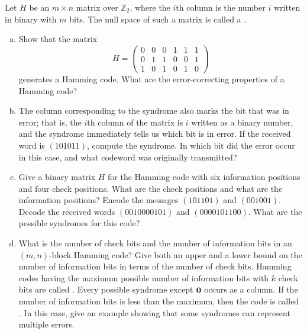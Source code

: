 \begin{exercise}{}
Let $H$ be an $m \times n$ matrix over $\mathbb{Z}_2$, where the $i$th
column is the number $i$ written in binary with $m$ bits. The null
space of such a matrix is called a . 

\begin{enumerate}[(a)]
\item
Show  that the matrix
\[
H =
\left(
\begin{array}{cccccc}
0 & 0 & 0 & 1 & 1 & 1 \\
0 & 1 & 1 & 0 & 0 & 1 \\
1 & 0 & 1 & 0 & 1 & 0
\end{array}
\right)
\]
generates a Hamming code. What are the error-correcting properties of
a Hamming code? 
 
\item
The column corresponding to the syndrome also marks the bit that was
in error; that is, the $i$th column of the matrix is $i$ written as a
binary number, and the syndrome 
immediately tells us which bit is in error. If the received word is 
$(101011)$, compute the syndrome.  In
which bit did the error occur in this case, and what codeword was
originally transmitted?
 
\item
Give a binary matrix $H$ for the Hamming code with six information
positions and four check positions. What are the check positions and
what are the information positions? Encode the messages $(101101)$ and
$(001001)$. Decode the received words $(0010000101)$ and
$(0000101100)$.  What are the possible syndromes for this code?
 
\item
What is the number of check bits and the number of information bits in an
$(m,n)$-block Hamming code? Give both an upper and a lower bound on the
number of information bits in terms of the number of check bits.
Hamming codes having the maximum possible number of information bits
with $k$ check bits are called . Every possible syndrome except
${\bold 0}$ occurs as a column. If the number of information bits is
less than the maximum, then the code is called . In this case, give an example
showing that some syndromes can represent multiple errors.  
 
\end{enumerate}
 \end{exercise}

